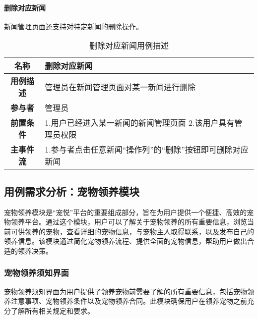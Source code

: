\paragraph{删除对应新闻}

新闻管理页面还支持对特定新闻的删除操作。\\

\begin{table}[H]
	\centering
	\caption{删除对应新闻用例描述}
	\renewcommand\arraystretch{1.5}
	\begin{tabular}{|c|>{\raggedright\arraybackslash}p{10cm}|}
		\hline
		\textbf{名称} & \textbf{删除对应新闻}\\
		\hline
		\textbf{用例描述} & 管理员在新闻管理页面对某一新闻进行删除\\ 
		\hline
		\textbf{参与者} & 管理员\\
		\hline
		\textbf{前置条件} & 
		1.用户已经进入某一新闻的新闻管理页面\newline
		2.该用户具有管理员权限\\
		\hline
		\textbf{主事件流} & 
		1.参与者点击任意新闻“操作列”的“删除”按钮即可删除对应新闻\\
		\hline
	\end{tabular}
\end{table}

\subsection{用例需求分析：宠物领养模块}

宠物领养模块是“宠悦”平台的重要组成部分，旨在为用户提供一个便捷、高效的宠物领养平台。通过这个模块，用户可以了解关于宠物领养的所有重要信息，浏览当前可供领养的宠物，查看详细的宠物信息，与宠物主人取得联系，以及发布自己的领养信息。该模块通过简化宠物领养流程、提供全面的宠物信息，帮助用户做出合适的领养决策。


\subsubsection{宠物领养须知界面}

宠物领养须知界面为用户提供了领养宠物前需要了解的所有重要信息，包括宠物领养注意事项、宠物领养条件以及宠物领养合同。此模块确保用户在领养宠物之前充分了解所有相关规定和要求。

